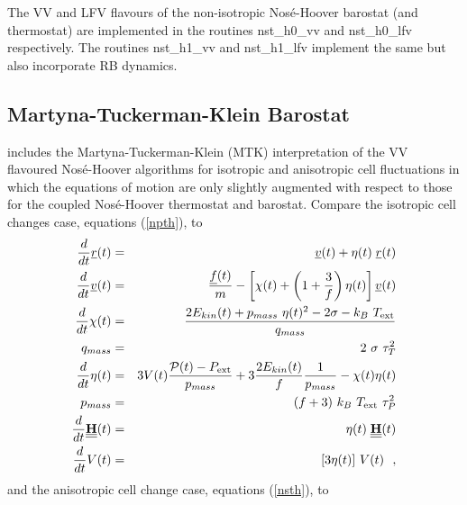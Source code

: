 The VV and LFV flavours of the non-isotropic Nos\'e-Hoover
barostat (and thermostat) are implemented in the \D routines
{\sc nst\_h0\_vv} and {\sc nst\_h0\_lfv} respectively.
The routines {\sc nst\_h1\_vv} and {\sc nst\_h1\_lfv} implement the
same but also incorporate RB dynamics.

\subsection{Martyna-Tuckerman-Klein Barostat}

\D includes the Martyna-Tuckerman-Klein (MTK) interpretation of the
VV flavoured Nos\'{e}-Hoover algorithms \cite{martyna-96a} for isotropic
and anisotropic cell fluctuations in which the equations of motion are
only slightly augmented with respect to those for the coupled
Nos\'e-Hoover thermostat and
barostat.  Compare the isotropic cell
changes case, equations (\ref{npth}), to
\begin{eqnarray}
\frac{d}{dt} \mbox{$\underline{r}$}(t) &=& \mbox{$\underline{v}$}(t) + \eta (t) \; \mbox{$\underline{r}$}(t) \nonumber \\
\frac{d}{dt} \mbox{$\underline{v}$}(t) &=& \frac{\mbox{$\underline{f}$}(t)}{m} - \left[ \chi(t) +
\left(1+\frac{3}{f}\right) \eta (t) \right] \mbox{$\underline{v}$}(t) \nonumber \\
\frac{d}{dt} \chi(t) &=& \frac{2 E_{kin}(t) + p_{mass}~\eta (t)^{2} -
2 \sigma - k_{B}~T_{\rm ext}}{q_{mass}} \nonumber \\
q_{mass} &=& 2~\sigma~\tau_{T}^{2} \\
\frac{d}{dt}\eta (t) &=& 3 V(t) \frac{{\cal P}(t) - P_{\rm ext}}{p_{mass}} +
3 \frac{2 E_{kin}(t)}{f} \frac{1}{p_{mass}} - \chi(t) \eta (t) \nonumber \\
p_{mass} &=& (f+3)~k_{B}~T_{\rm ext}~\tau_{P}^{2} \nonumber \\
\frac{d}{dt}\mbox{$\underline{\underline{\bf H}}$}(t) &=& \eta (t) \; \mbox{$\underline{\underline{\bf H}}$}(t) \nonumber \\
\frac{d}{dt} V(t) &=& [3 \eta (t)]~V(t)~~, \nonumber
\end{eqnarray}
and the anisotropic cell change case, equations (\ref{nsth}), to
